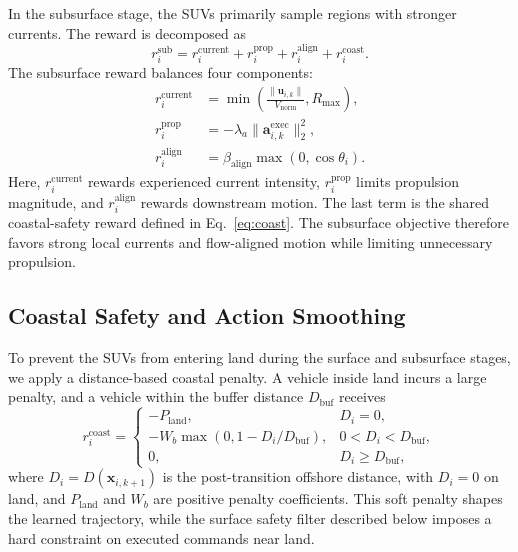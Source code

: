 \documentclass[a4paper,fleqn]{cas-dc}
\begin{document}
In the subsurface stage, the SUVs primarily sample regions with stronger
currents. The reward is decomposed as
\begin{equation}
r_i^{\mathrm{sub}}
=r_i^{\mathrm{current}}
+r_i^{\mathrm{prop}}
+r_i^{\mathrm{align}}
+r_i^{\mathrm{coast}}.
\label{eq:sub_reward}
\end{equation}
The subsurface reward balances four components:
\begin{equation}
\begin{aligned}
r_i^{\mathrm{current}}
&=\min\left(
\frac{\|\mathbf{u}_{i,k}\|}{V_{\mathrm{norm}}},
R_{\max}
\right),\\
r_i^{\mathrm{prop}}
&=-\lambda_a\|\mathbf{a}_{i,k}^{\mathrm{exec}}\|_2^2,\\
r_i^{\mathrm{align}}
&=\beta_{\mathrm{align}}\max(0,\cos\theta_i).
\end{aligned}
\label{eq:sub_reward_terms}
\end{equation}
Here, \(r_i^{\mathrm{current}}\) rewards experienced current intensity,
\(r_i^{\mathrm{prop}}\) limits propulsion magnitude, and
\(r_i^{\mathrm{align}}\) rewards downstream motion. The last term is the shared
coastal-safety reward defined in Eq.~\eqref{eq:coast}. The subsurface objective
therefore favors strong local currents and flow-aligned motion while limiting
unnecessary propulsion.

\subsection{Coastal Safety and Action Smoothing}
\label{subsec:coastal_smoothing}

To prevent the SUVs from entering land during the surface and subsurface stages,
we apply a distance-based coastal penalty. A vehicle inside land incurs a
large penalty, and a vehicle within the buffer distance $D_{\mathrm{buf}}$
receives
\begin{equation}
r_i^{\mathrm{coast}}=
\begin{cases}
-P_{\mathrm{land}}, & D_i=0,\\
-W_b\max(0,1-D_i/D_{\mathrm{buf}}), & 0<D_i<D_{\mathrm{buf}},\\
0, & D_i\geq D_{\mathrm{buf}},
\end{cases}
\label{eq:coast}
\end{equation}
where $D_i=D(\mathbf{x}_{i,k+1})$ is the post-transition offshore distance,
with $D_i=0$ on land, and $P_{\mathrm{land}}$ and $W_b$ are positive penalty
coefficients. This soft penalty shapes the learned trajectory, while the surface
safety filter described below imposes a hard constraint on executed commands
near land.
\end{document}
